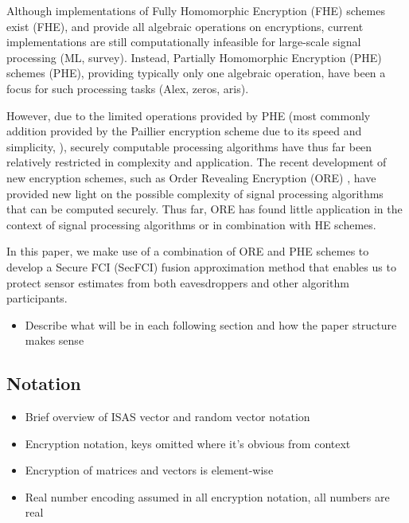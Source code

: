 \documentclass[letterpaper, 10 pt, conference]{ieeeconf}  %
\begin{document}
Although implementations of Fully Homomorphic Encryption (FHE) schemes exist \cite{}(FHE), and provide all algebraic operations on encryptions, current implementations are still computationally infeasible for large-scale signal processing \cite{}(ML, survey). Instead, Partially Homomorphic Encryption (PHE) schemes \cite{}(PHE), providing typically only one algebraic operation, have been a focus for such processing tasks \cite{}(Alex, zeros, aris).

However, due to the limited operations provided by PHE (most commonly addition provided by the Paillier encryption scheme due to its speed and simplicity, \cite{}), securely computable processing algorithms have thus far been relatively restricted in complexity and application. The recent development of new encryption schemes, such as Order Revealing Encryption (ORE) \cite{}, have provided new light on the possible complexity of signal processing algorithms that can be computed securely. Thus far, ORE has found little application in the context of signal processing algorithms or in combination with HE schemes.

In this paper, we make use of a combination of ORE and PHE schemes to develop a Secure FCI (SecFCI) fusion approximation method that enables us to protect sensor estimates from both eavesdroppers and other algorithm participants.

\begin{itemize}
   \item Describe what will be in each following section and how the paper structure makes sense
\end{itemize}
\subsection{Notation}
\begin{itemize}
   \item Brief overview of ISAS vector and random vector notation
   \item Encryption notation, keys omitted where it's obvious from context
   \item Encryption of matrices and vectors is element-wise
   \item Real number encoding assumed in all encryption notation, all numbers are real
\end{itemize}

\end{document}
